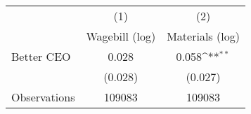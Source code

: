 {
\def\sym#1{\ifmmode^{#1}\else\(^{#1}\)\fi}
\begin{tabular}{l*{2}{c}}
\hline\hline
                    &\multicolumn{1}{c}{(1)}&\multicolumn{1}{c}{(2)}\\
                    &\multicolumn{1}{c}{Wagebill (log)}&\multicolumn{1}{c}{Materials (log)}\\
\hline
Better CEO          &       0.028         &       0.058\sym{**} \\
                    &     (0.028)         &     (0.027)         \\
\hline
Observations        &      109083         &      109083         \\
\hline\hline
\end{tabular}
}
